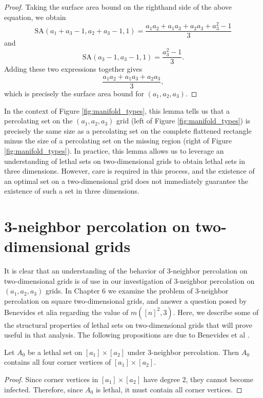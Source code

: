 \begin{proof}
Taking the surface area bound on the righthand side of the above equation, we obtain
$$\text{SA}(a_1+a_3-1, a_2+a_3-1, 1) = \frac{a_1a_2 + a_1a_3 + a_2a_3 + a_3^2 -1}{3}$$
and
$$\text{SA}(a_3-1, a_3-1, 1) = \frac{a_3^2 -1}{3}.$$
Adding these two expressions together gives
$$\frac{a_1a_2 + a_1a_3 + a_2a_3}{3},$$
which is precisely the surface area bound for $(a_1, a_2, a_3)$. 
\end{proof}

In the context of Figure \ref{fig:manifold_types}, this lemma tells us that a percolating set on the $(a_1,a_2,a_3)$ grid (left of Figure \ref{fig:manifold_types}) is precisely the same size as a percolating set on the complete flattened rectangle minus the size of a percolating set on the missing region (right of Figure \ref{fig:manifold_types}). In practice, this lemma allows us to leverage an understanding of lethal sets on two-dimensional grids to obtain lethal sets in three dimensions. However, care is required in this process, and the existence of an optimal set on a two-dimensional grid does not immediately guarantee the existence of such a set in three dimensions. 

\section{3-neighbor percolation on two-dimensional grids}

It is clear that an understanding of the behavior of 3-neighbor percolation on two-dimensional grids is of use in our investigation of 3-neighbor percolation on $(a_1,a_2,a_3)$ grids. In Chapter 6 we examine the problem of 3-neighbor percolation on square two-dimensional grids, and answer a question posed by Benevides et alia regarding the value of $m([n]^2, 3)$. Here, we describe some of the structural properties of lethal sets on two-dimensional grids that will prove useful in that analysis. The following propositions are due to Benevides et al \cite{benevides}. 

\begin{prop}
\label{prop:corners}
Let $A_0$ be a lethal set on $[a_1] \times [a_2]$ under 3-neighbor percolation. Then $A_0$ contains all four corner vertices of $[a_1] \times [a_2]$.
\end{prop}

\begin{proof}
Since corner vertices in $[a_1] \times [a_2]$ have degree 2, they cannot become infected. Therefore, since $A_0$ is lethal, it must contain all corner vertices.
\end{proof}

